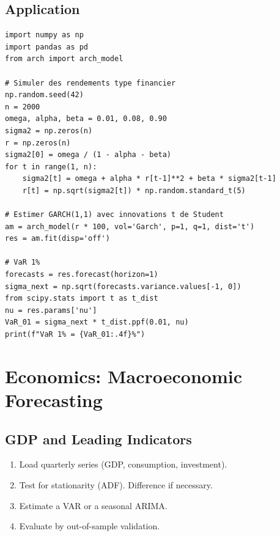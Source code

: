 \subsection{Application}

\begin{codeblock}[title=\textbf{Python --- VaR with GARCH}]
\begin{verbatim}
import numpy as np
import pandas as pd
from arch import arch_model

# Simuler des rendements type financier
np.random.seed(42)
n = 2000
omega, alpha, beta = 0.01, 0.08, 0.90
sigma2 = np.zeros(n)
r = np.zeros(n)
sigma2[0] = omega / (1 - alpha - beta)
for t in range(1, n):
    sigma2[t] = omega + alpha * r[t-1]**2 + beta * sigma2[t-1]
    r[t] = np.sqrt(sigma2[t]) * np.random.standard_t(5)

# Estimer GARCH(1,1) avec innovations t de Student
am = arch_model(r * 100, vol='Garch', p=1, q=1, dist='t')
res = am.fit(disp='off')

# VaR 1%
forecasts = res.forecast(horizon=1)
sigma_next = np.sqrt(forecasts.variance.values[-1, 0])
from scipy.stats import t as t_dist
nu = res.params['nu']
VaR_01 = sigma_next * t_dist.ppf(0.01, nu)
print(f"VaR 1% = {VaR_01:.4f}%")
\end{verbatim}
\end{codeblock}

\section{Economics: Macroeconomic Forecasting}

\subsection{GDP and Leading Indicators}

\begin{method}
\begin{enumerate}
\item Load quarterly series (GDP, consumption, investment).
\item Test for stationarity (ADF). Difference if necessary.
\item Estimate a VAR or a seasonal ARIMA.
\item Evaluate by out-of-sample validation.
\end{enumerate}
\end{method}

